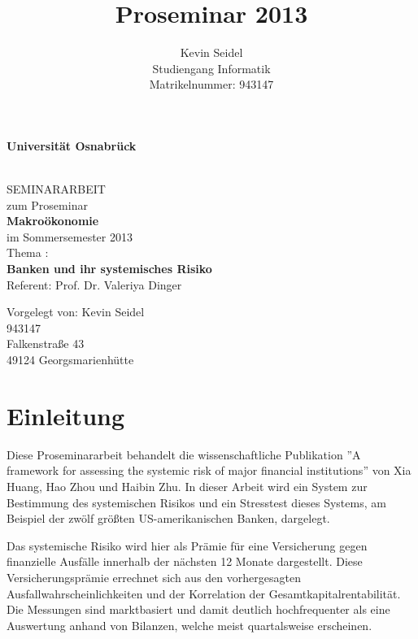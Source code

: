 \documentclass[a4paper,12pt]{scrartcl}
\title{Proseminar 2013}
\author{Kevin Seidel \\ Studiengang Informatik \\ Matrikelnummer: 943147}
\begin{document}
\begin{titlepage}
\begin{center}
\vspace*{1.5cm}
\begin{Large}
\textbf{Universität Osnabrück} \\[1cm]
\end{Large}

\noindent\hrulefill
\\[1.5cm]
SEMINARARBEIT \\[1cm]
zum Proseminar \\[1cm]
\textbf{Makroökonomie} \\[1cm]
im Sommersemester 2013 \\[1.5cm]
Thema : \\[1cm]
\textbf{Banken und ihr systemisches Risiko} \\[1cm]
Referent: Prof. Dr. Valeriya Dinger \\[2cm]

\end{center}
\begin{flushleft}
Vorgelegt von: \hfill Kevin Seidel \\
\hfill 943147 \\
\hfill Falkenstraße 43 \\
\hfill 49124 Georgsmarienhütte
\end{flushleft}

\end{titlepage}

\newpage

\setcounter{page}{2}
\tableofcontents



\newpage
{} 
\setcounter{page}{1} 


\section{Einleitung}
Diese Proseminararbeit behandelt die wissenschaftliche Publikation ''A framework for assessing the systemic risk of major financial institutions'' von Xia Huang, Hao Zhou und Haibin Zhu. In dieser Arbeit wird ein System zur Bestimmung des systemischen Risikos und ein Stresstest dieses Systems, am Beispiel der zwölf größten US-amerikanischen Banken, dargelegt.

Das systemische Risiko wird hier als Prämie für eine Versicherung gegen finanzielle Ausfälle innerhalb der nächsten 12 Monate dargestellt. Diese Versicherungsprämie errechnet sich aus den vorhergesagten Ausfallwahrscheinlichkeiten und der Korrelation der Gesamtkapitalrentabilität. Die Messungen sind marktbasiert und damit deutlich hochfrequenter als eine Auswertung anhand von Bilanzen, welche meist quartalsweise erscheinen. 
\end{document}
